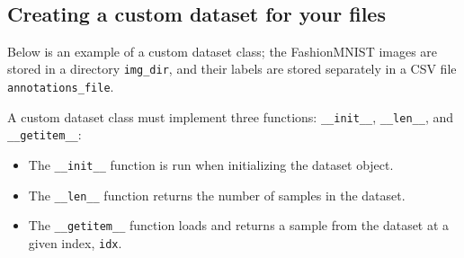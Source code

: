 \documentclass[11pt]{article}
\providecommand{\tightlist}{%
      \setlength{\itemsep}{0pt}\setlength{\parskip}{0pt}}
\begin{document}
    \begin{center}
    \end{center}
    { \hspace*{\fill} \\}
    
    \subsection{Creating a custom dataset for your
files}\label{creating-a-custom-dataset-for-your-files}

    Below is an example of a custom dataset class; the FashionMNIST images
are stored in a directory \texttt{img\_dir}, and their labels are stored
separately in a CSV file \texttt{annotations\_file}.

A custom dataset class must implement three functions:
\texttt{\_\_init\_\_}, \texttt{\_\_len\_\_}, and
\texttt{\_\_getitem\_\_}:

\begin{itemize}
\tightlist
\item
  The \texttt{\_\_init\_\_} function is run when initializing the
  dataset object.
\item
  The \texttt{\_\_len\_\_} function returns the number of samples in the
  dataset.
\item
  The \texttt{\_\_getitem\_\_} function loads and returns a sample from
  the dataset at a given index, \texttt{idx}.
\end{itemize}
\end{document}
